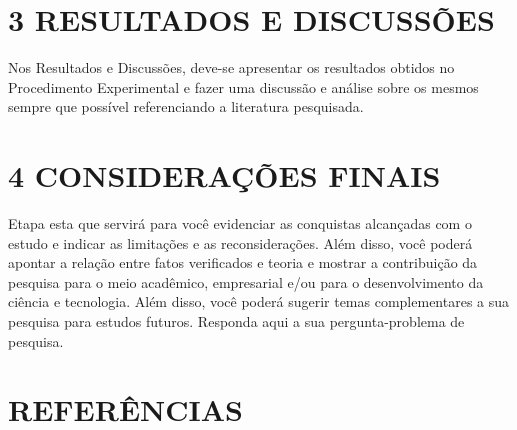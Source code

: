 \documentclass[
]{article}
\begin{document}
\section{3 RESULTADOS E DISCUSSÕES}\label{resultados-e-discussuxf5es}

Nos Resultados e Discussões, deve-se apresentar os resultados obtidos no
Procedimento Experimental e fazer uma discussão e análise sobre os
mesmos sempre que possível referenciando a literatura pesquisada.

\section{4 CONSIDERAÇÕES FINAIS}\label{considerauxe7uxf5es-finais}

Etapa esta que servirá para você evidenciar as conquistas alcançadas com
o estudo e indicar as limitações e as reconsiderações. Além disso, você
poderá apontar a relação entre fatos verificados e teoria e mostrar a
contribuição da pesquisa para o meio acadêmico, empresarial e/ou para o
desenvolvimento da ciência e tecnologia. Além disso, você poderá sugerir
temas complementares a sua pesquisa para estudos futuros. Responda aqui
a sua pergunta-problema de pesquisa.

\section*{REFERÊNCIAS}\label{referuxeancias}
\end{document}
